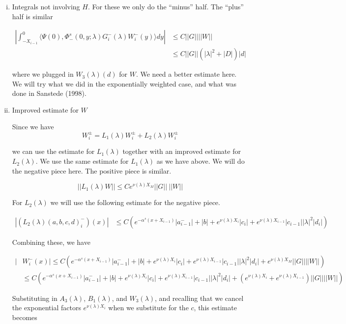 \documentclass[12pt]{article}
\begin{document}
\begin{enumerate}
\begin{enumerate}[(i)]

\item Integrals not involving $H$. For these we only do the ``minus'' half. The ``plus'' half is similar

\begin{align*}
\left| \int_{-X_{i-1}}^0 \langle \Psi(0), \Phi^s_-(0, y; \lambda) G_i^-(\lambda)W_i^-(y) \rangle dy \right| 
&\leq C ||G|| ||W|| \\
&\leq C ||G|| ( |\lambda|^2 + |D|)|d|
\end{align*}

where we plugged in $W_3(\lambda)(d)$ for $W$. We need a better estimate here. We will try what we did in the exponentially weighted case, and what was done in Sanstede (1998).

\item Improved estimate for $W$

Since we have 
\[
W_i^\pm = L_1(\lambda)W_i^\pm + L_2(\lambda)W_i^\pm 
\]

we can use the estimate for $L_1(\lambda)$ together with an improved estimate for $L_2(\lambda)$. We use the same estimate for $L_1(\lambda)$ as we have above. We will do the negative piece here. The positive piece is similar.

\[
||L_1(\lambda)W|| \leq C e^{\nu(\lambda)X_M} ||G|| \: ||W||
\]

For $L_2(\lambda)$ we will use the following estimate for the negative piece.

\begin{align*}
| (L_2(\lambda)(a, b, c, d)_i^-)(x)| &\leq C \left( e^{-\alpha^s(x + X_{i-1})} |a^-_{i-1}| + |b| + e^{\nu(\lambda)X_i} |c_i| + e^{\nu(\lambda)X_{i-1}} |c_{i-1}| |\lambda|^2 |d_i| \right)
\end{align*}

Combining these, we have

\begin{align*}
| &W_i^-(x)| \leq C \left( e^{-\alpha^s(x + X_{i-1})} |a^-_{i-1}| + |b| + e^{\nu(\lambda)X_i} |c_i| + e^{\nu(\lambda)X_{i-1}} |c_{i-1}| |\lambda|^2 |d_i| + e^{\nu(\lambda)X_M} ||G|| ||W|| \right) \\
&\leq C \left( e^{-\alpha^s(x + X_{i-1})} |a^-_{i-1}| + |b| + e^{\nu(\lambda)X_i} |c_i| + e^{\nu(\lambda)X_{i-1}} |c_{i-1}| |\lambda|^2 |d_i| + (e^{\nu(\lambda)X_i} + e^{\nu(\lambda)X_{i-1}} )||G|| ||W|| \right)
\end{align*}

Substituting in $A_3(\lambda)$, $B_1(\lambda)$, and $W_3(\lambda)$, and recalling that we cancel the exponential factors $e^{\nu(\lambda)X_i}$ when we substitute for the $c$, this estimate becomes


\end{enumerate}
\end{enumerate}
\end{document}
